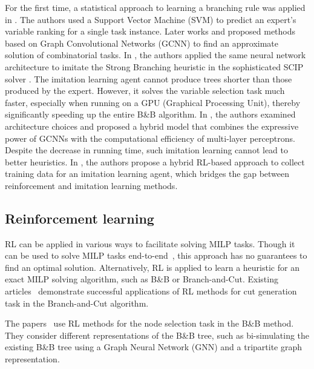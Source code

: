 \documentclass[preprint,12pt]{elsarticle} %
\theoremstyle{plain}
\theoremstyle{definition}
\theoremstyle{remark}
\begin{document}
For the first time, a statistical approach to learning a branching rule was applied in \cite{Khalil2016}. The authors used a Support Vector Machine (SVM) \cite{cortes1995support} to predict an expert's variable ranking for a single task instance. 
Later works \cite{khalil_2017} and \cite{selsam_2019} proposed methods based on Graph Convolutional Networks (GCNN) \cite{GCNN} to find an approximate solution of combinatorial tasks. In \cite{gasse_2019}, the authors applied the same neural network architecture to imitate the Strong Branching heuristic in the sophisticated SCIP solver \cite{scip}. The imitation learning agent cannot produce trees shorter than those produced by the expert. However, it solves the variable selection task much faster, especially when running on a GPU (Graphical Processing Unit), thereby significantly speeding up the entire B\&B algorithm. 
In \cite{hybrid}, the authors examined architecture choices and proposed a hybrid model that combines the expressive power of GCNNs with the computational efficiency of multi-layer perceptrons. Despite the decrease in running time, such imitation learning cannot lead to better heuristics. In \cite{DBLP:conf/iclr/ZhangOYGSGDY24}, the authors propose a hybrid RL-based approach to collect training data for an imitation learning agent, which bridges the gap between reinforcement and imitation learning methods. 

\subsection{Reinforcement learning}

RL can be applied in various ways to facilitate solving MILP tasks. Though it can be used to solve MILP tasks end-to-end~\cite{DBLP:journals/corr/abs-2411-19517}, this approach has no guarantees to find an optimal solution. Alternatively, RL is applied to learn a heuristic for an exact MILP solving algorithm, such as B\&B or Branch-and-Cut. Existing articles~\cite{10.1145/3728371, DBLP:journals/corr/abs-2503-15847} demonstrate successful applications of RL methods for cut generation task in the Branch-and-Cut algorithm. 

The papers~\cite{mattick2024reinforcement,DBLP:conf/iclr/ZhangZLW025} use RL methods for the node selection task in the B\&B method. They consider different representations of the B\&B tree, such as bi-simulating the existing B\&B tree using a Graph Neural Network (GNN) and a tripartite graph representation.
\end{document}
